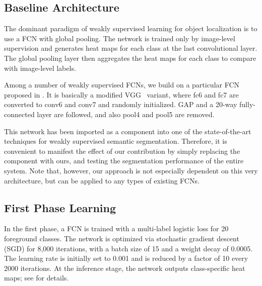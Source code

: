 \documentclass[10pt,twocolumn,letterpaper]{article}
\begin{document}
\subsection{Baseline Architecture}
\label{sec:Architecture}
The dominant paradigm of weakly supervised learning for object localization is to use a FCN with global pooling. The network is trained only by image-level supervision and generates heat maps for each class at the last convolutional layer. The global pooling layer then aggregates the heat maps for each class to compare with image-level labels. %


Among a number of weakly supervised FCNs, we build on a particular FCN proposed in \cite{zhou2016cvpr}. It is basically a modified VGG~\cite{Simonyan14c} variant, where fc6 and fc7 are converted to conv6 and conv7 and randomly initialized. GAP and a 20-way fully-connected layer are followed, and also pool4 and pool5 are removed.%

This network has been imported as a component into one of the state-of-the-art techniques for weakly supervised semantic segmentation. Therefore, it is convenient to manifest the effect of our contribution by simply replacing the component with ours, and testing the segmentation performance of the entire system. Note that, however, our approach is not especially dependent on this very architecture, but can be applied to any types of existing FCNs.

\subsection{First Phase Learning}
In the first phase, a FCN is trained with a multi-label logistic loss for 20 foreground classes. The network is optimized via stochastic gradient descent (SGD) for 8,000 iterations, with a batch size of 15 and a weight decay of 0.0005. The learning rate is initially set to 0.001 and is reduced by a factor of 10 every 2000 iterations. At the inference stage, the network outputs class-specific heat maps; see \cite{zhou2016cvpr} for details.
\end{document}
